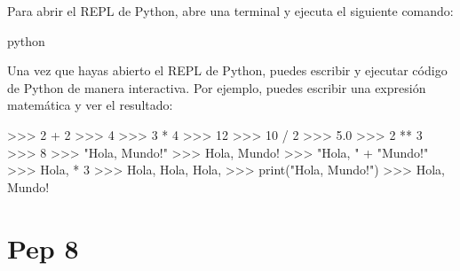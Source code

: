 \documentclass[
  a4paper,
  DIV=11,
  numbers=noendperiod,
  onepage,
  openany]{scrreprt}
\newenvironment{Shaded}{\begin{snugshade}}{\end{snugshade}}
\newcommand{\BuiltInTok}[1]{\textcolor[rgb]{0.00,0.23,0.31}{#1}}
\newcommand{\DecValTok}[1]{\textcolor[rgb]{0.68,0.00,0.00}{#1}}
\newcommand{\ExtensionTok}[1]{\textcolor[rgb]{0.00,0.23,0.31}{#1}}
\newcommand{\FloatTok}[1]{\textcolor[rgb]{0.68,0.00,0.00}{#1}}
\newcommand{\NormalTok}[1]{\textcolor[rgb]{0.00,0.23,0.31}{#1}}
\newcommand{\OperatorTok}[1]{\textcolor[rgb]{0.37,0.37,0.37}{#1}}
\newcommand{\StringTok}[1]{\textcolor[rgb]{0.13,0.47,0.30}{#1}}
\begin{document}
Para abrir el REPL de Python, abre una terminal y ejecuta el siguiente
comando:

\begin{Shaded}
\begin{Highlighting}[]
\ExtensionTok{python}
\end{Highlighting}
\end{Shaded}

Una vez que hayas abierto el REPL de Python, puedes escribir y ejecutar
código de Python de manera interactiva. Por ejemplo, puedes escribir una
expresión matemática y ver el resultado:

\begin{Shaded}
\begin{Highlighting}[]
\OperatorTok{\textgreater{}\textgreater{}\textgreater{}} \DecValTok{2} \OperatorTok{+} \DecValTok{2}
\OperatorTok{\textgreater{}\textgreater{}\textgreater{}} \DecValTok{4}
\OperatorTok{\textgreater{}\textgreater{}\textgreater{}} \DecValTok{3} \OperatorTok{*} \DecValTok{4}
\OperatorTok{\textgreater{}\textgreater{}\textgreater{}} \DecValTok{12}
\OperatorTok{\textgreater{}\textgreater{}\textgreater{}} \DecValTok{10} \OperatorTok{/} \DecValTok{2}
\OperatorTok{\textgreater{}\textgreater{}\textgreater{}} \FloatTok{5.0}
\OperatorTok{\textgreater{}\textgreater{}\textgreater{}} \DecValTok{2} \OperatorTok{**} \DecValTok{3}
\OperatorTok{\textgreater{}\textgreater{}\textgreater{}} \DecValTok{8}
\OperatorTok{\textgreater{}\textgreater{}\textgreater{}} \StringTok{"Hola, Mundo!"}
\OperatorTok{\textgreater{}\textgreater{}\textgreater{}} \StringTok{\textquotesingle{}Hola, Mundo!\textquotesingle{}}
\OperatorTok{\textgreater{}\textgreater{}\textgreater{}} \StringTok{"Hola, "} \OperatorTok{+} \StringTok{"Mundo!"}
\OperatorTok{\textgreater{}\textgreater{}\textgreater{}} \StringTok{\textquotesingle{}Hola, \textquotesingle{}} \OperatorTok{*} \DecValTok{3}
\OperatorTok{\textgreater{}\textgreater{}\textgreater{}} \StringTok{\textquotesingle{}Hola, Hola, Hola, \textquotesingle{}}
\OperatorTok{\textgreater{}\textgreater{}\textgreater{}} \BuiltInTok{print}\NormalTok{(}\StringTok{"Hola, Mundo!"}\NormalTok{)}
\OperatorTok{\textgreater{}\textgreater{}\textgreater{}}\NormalTok{ Hola, Mundo}\OperatorTok{!}
\end{Highlighting}
\end{Shaded}

\chapter{Pep 8}\label{pep-8}
\end{document}
